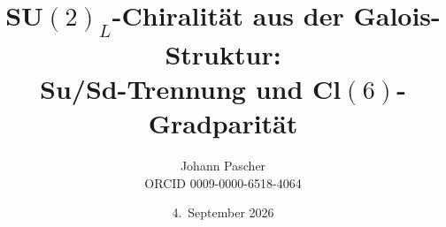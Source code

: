 \documentclass[11pt,a4paper]{report}
\title{SU$(2)_L$-Chiralität aus der Galois-Struktur:\\[0.5em]
  \large Su/Sd-Trennung und Cl$(6)$-Gradparität}
\date{4.~September 2026}
\author{Johann Pascher\\\small ORCID 0009-0000-6518-4064}
\begin{document}
\renewcommand{\thechapter}{}
\renewcommand{\thesection}{\arabic{section}}
\maketitle
\tableofcontents

\end{document}

